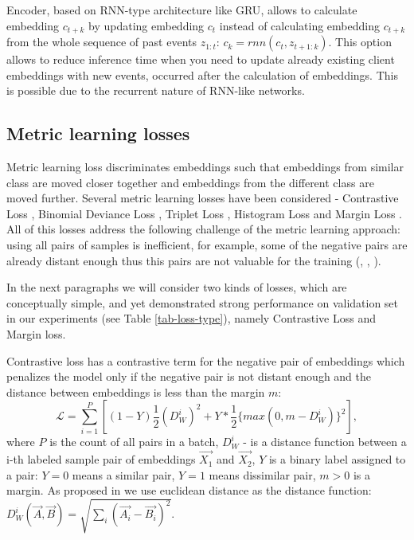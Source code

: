 \documentclass[sigconf, anonymous]{acmart}
\begin{document}
Encoder, based on RNN-type architecture like GRU\cite{cho2014learning}, allows to calculate embedding $c_{t+k}$ by updating embedding $c_t$ instead of  calculating embedding $c_{t+k}$ from the whole sequence of past events $z_{1:t}$: $c_k = rnn(c_t, z_{t+1:k})$. This option allows to reduce inference time when you need to update already existing client embeddings with new events, occurred after the calculation of embeddings. This is possible due to the recurrent nature of RNN-like networks.

\subsection{Metric learning losses} \label{sec-ml-loss}

Metric learning loss discriminates embeddings such that embeddings from similar class are moved closer together and embeddings from the different class are moved further. Several metric learning losses have been considered - Contrastive Loss \cite{Hadsell:2006:DRL:1153171.1153654}, Binomial Deviance Loss \cite{Yi:2014:LUE:1407.4979}, Triplet Loss \cite{Hoffer:2015:LUE:1412.6622}, Histogram Loss \cite{histogram-loss} and Margin Loss \cite{wu2017sampling}. All of this losses address the following challenge of the metric learning approach: using all pairs of samples is inefficient, for example, some of the negative pairs are already distant enough thus this pairs are not valuable for the training (\cite{simo2015discriminative}, \cite{wu2017sampling}, \cite{Schroff2015FaceNetAU}).

In the next paragraphs we will consider two kinds of losses, which are conceptually simple, and yet demonstrated strong performance on validation set in our experiments (see Table \ref{tab-loss-type}), namely Contrastive Loss and Margin loss.

Contrastive loss has a contrastive term for the negative pair of embeddings which penalizes the model only if the negative pair is not distant enough and the distance between embeddings is less than the margin $m$:  
\begin{equation}
 \mathcal{L} = \sum_{i=1}^P \left[ (1-Y)\dfrac{1}{2}(D_W^i)^2 +Y*\dfrac{1}{2}\{max(0,m-D_W^i)\}^2 \right],
\end{equation}
where $P$ is the count of all pairs in a batch, $D_W^i$ - is a distance function between a i-th labeled sample pair of embeddings $\vec{X_1}$ and $\vec{X_2}$, 
$Y$ is a binary label assigned to a pair: $Y = 0$ means a similar pair, $Y = 1$ means dissimilar pair, $m > 0$ is a margin.
As proposed in \cite{Hadsell:2006:DRL:1153171.1153654} we use euclidean distance as the distance function: $D_W^i(\vec{A},\vec{B}) = \sqrt{\sum_i(\vec{A_i} - \vec{B_i})^2}$.
\end{document}
